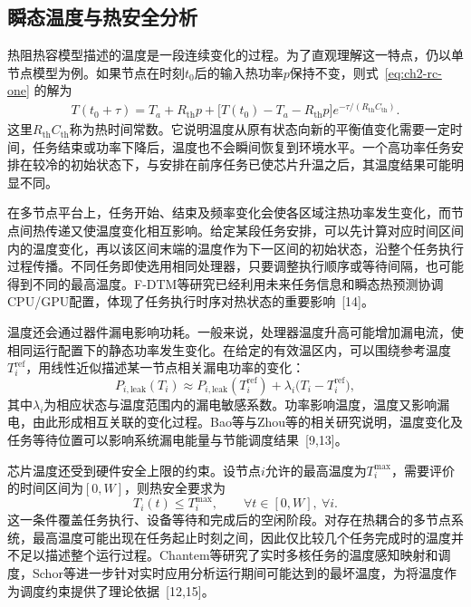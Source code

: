 \subsection{瞬态温度与热安全分析}

热阻热容模型描述的温度是一段连续变化的过程。为了直观理解这一特点，仍以单节点模型为例。如果节点在时刻$t_0$后的输入热功率$p$保持不变，则式~\eqref{eq:ch2-rc-one} 的解为
\begin{equation}\label{eq:ch2-single-response}
 \begin{aligned}
 T(t_0+\tau)=T_a+R_{\mathrm{th}}p
 +\bigl[T(t_0)-T_a-R_{\mathrm{th}}p\bigr]
 e^{-\tau/(R_{\mathrm{th}}C_{\mathrm{th}})}.
 \end{aligned}
\end{equation}
这里$R_{\mathrm{th}}C_{\mathrm{th}}$称为热时间常数。它说明温度从原有状态向新的平衡值变化需要一定时间，任务结束或功率下降后，温度也不会瞬间恢复到环境水平。一个高功率任务安排在较冷的初始状态下，与安排在前序任务已使芯片升温之后，其温度结果可能明显不同。

在多节点平台上，任务开始、结束及频率变化会使各区域注热功率发生变化，而节点间热传递又使温度变化相互影响。给定某段任务安排，可以先计算对应时间区间内的温度变化，再以该区间末端的温度作为下一区间的初始状态，沿整个任务执行过程传播。不同任务即使选用相同处理器，只要调整执行顺序或等待间隔，也可能得到不同的最高温度。F-DTM等研究已经利用未来任务信息和瞬态热预测协调CPU/GPU配置，体现了任务执行时序对热状态的重要影响~[14]。

温度还会通过器件漏电影响功耗。一般来说，处理器温度升高可能增加漏电流，使相同运行配置下的静态功率发生变化。在给定的有效温区内，可以围绕参考温度$T_i^{\mathrm{ref}}$，用线性近似描述某一节点相关漏电功率的变化：
\begin{equation}\label{eq:ch2-temp-leak}
 P_{i,\mathrm{leak}}(T_i)
 \approx P_{i,\mathrm{leak}}(T_i^{\mathrm{ref}})
 +\lambda_i\bigl(T_i-T_i^{\mathrm{ref}}\bigr),
\end{equation}
其中$\lambda_i$为相应状态与温度范围内的漏电敏感系数。功率影响温度，温度又影响漏电，由此形成相互关联的变化过程。Bao等与Zhou等的相关研究说明，温度变化及任务等待位置可以影响系统漏电能量与节能调度结果~[9,13]。

芯片温度还受到硬件安全上限的约束。设节点$i$允许的最高温度为$T_i^{\max}$，需要评价的时间区间为$[0,W]$，则热安全要求为
\begin{equation}\label{eq:ch2-thermal-safe}
 T_i(t)\le T_i^{\max},\qquad
 \forall t\in[0,W],\ \forall i.
\end{equation}
这一条件覆盖任务执行、设备等待和完成后的空闲阶段。对存在热耦合的多节点系统，最高温度可能出现在任务起止时刻之间，因此仅比较几个任务完成时的温度并不足以描述整个运行过程。Chantem等研究了实时多核任务的温度感知映射和调度，Schor等进一步针对实时应用分析运行期间可能达到的最坏温度，为将温度作为调度约束提供了理论依据~[12,15]。

